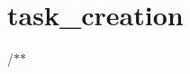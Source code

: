\chapter{task\+\_\+creation }
\hypertarget{md_doc_2task__creation}{}\label{md_doc_2task__creation}
/\+\texorpdfstring{$\ast$}{*}\texorpdfstring{$\ast$}{*}
\begin{DoxyItemize}
\item 
\end{DoxyItemize}